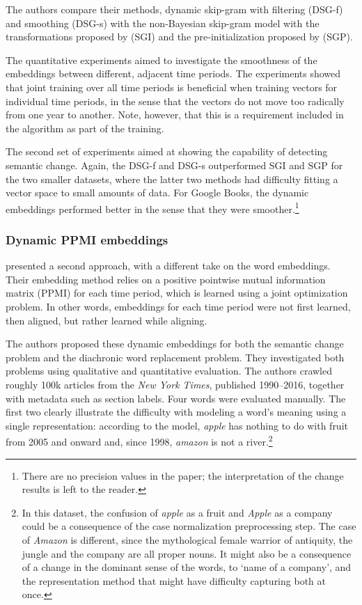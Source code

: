 \documentclass[output=paper]{langsci/langscibook}
\begin{document}
The authors compare their methods, dynamic skip-gram with filtering (DSG-f) and smoothing (DSG-s) with the non-Bayesian skip-gram model with the transformations proposed by \citet{hamilton-etal-2016-diachronic} (SGI) and the pre-ini\-tial\-iza\-tion proposed by \citet{kim-etal-2014-temporal} (SGP). 

The quantitative experiments aimed to investigate the smoothness of the embeddings between different, adjacent time periods. 
The experiments showed that joint training over all time periods is beneficial when training vectors for individual time periods, in the sense that the vectors do not move too radically from one year to another. Note, however, that this is a requirement included in the algorithm as part of the training.

The second set of experiments aimed at showing the capability of detecting semantic change. 
Again, the DSG-f and DSG-s outperformed SGI and SGP for the two smaller datasets, where the latter two methods had difficulty fitting a vector space to small amounts of data. For Google Books, the dynamic embeddings performed better in the sense that they were smoother.\footnote{There are no precision values in the paper; the interpretation of the change results is left to the reader.}

 
\subsubsection{Dynamic PPMI embeddings}
\citet{yao2018dynamic} presented a second approach, with a different take on the word embeddings. Their embedding method relies on a positive pointwise mutual information matrix (PPMI) for each time period, which is learned using a joint optimization problem. In other words, embeddings for each time period were not first learned, then aligned, but rather learned while aligning. 

\begin{sloppypar}
The authors proposed these dynamic embeddings for both the semantic change problem and the diachronic word replacement problem. They investigated both problems using qualitative and quantitative evaluation. The authors crawled roughly 100k articles from the \emph{New York Times}, published 1990--2016, together with metadata such as section labels. 
Four words were evaluated manually. 
The first two clearly illustrate the difficulty with modeling a word's meaning using a single representation: according to the model, \emph{apple} has nothing to do with fruit from 2005 and onward and, since 1998, \emph{amazon} is not a river.\footnote{In this dataset, the confusion of \emph{apple} as a fruit and \emph{Apple} as a company could be a consequence of  the case normalization preprocessing step. The case of \emph{Amazon} is different, since the mythological female warrior of antiquity, the jungle and the company are all proper nouns. It might also be a consequence of a change in the dominant sense of the words, to `name of a company', and the representation method that might have difficulty capturing both at once.}
\end{sloppypar} 
\end{document}

